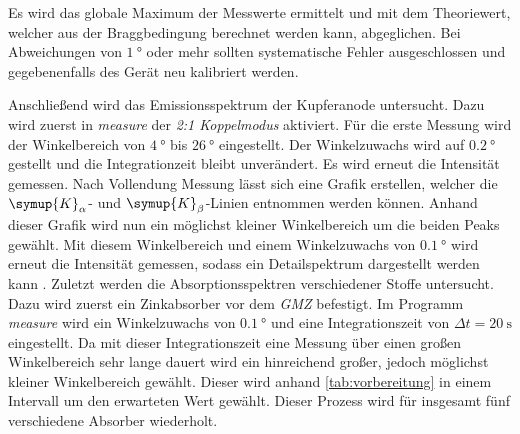 Es wird das globale Maximum der Messwerte ermittelt und mit dem Theoriewert, welcher aus der Braggbedingung berechnet werden kann, abgeglichen.
Bei Abweichungen von $\qty{1}{\degree}$ oder mehr sollten systematische Fehler ausgeschlossen und gegebenenfalls des Gerät neu kalibriert werden.

Anschließend wird das Emissionsspektrum der Kupferanode untersucht. Dazu wird zuerst in \textit{measure} der \textit{2:1 Koppelmodus} aktiviert. Für die erste Messung 
wird der Winkelbereich von $\qty{4}{\degree}$ bis $\qty{26}{\degree}$ eingestellt. Der Winkelzuwachs wird auf $\qty{0.2}{\degree}$ gestellt und die Integrationzeit bleibt 
unverändert. Es wird erneut die Intensität gemessen. Nach Vollendung Messung lässt sich eine Grafik erstellen, welcher die $\symup{K}_\alpha$- und $\symup{K}_\beta$-Linien 
entnommen werden können. Anhand dieser Grafik wird nun ein möglichst kleiner Winkelbereich um die beiden Peaks gewählt. Mit diesem Winkelbereich und einem Winkelzuwachs von
$\qty{0.1}{\degree}$ wird erneut die Intensität gemessen, sodass ein Detailspektrum dargestellt werden kann
. 
Zuletzt werden die Absorptionsspektren verschiedener Stoffe untersucht. Dazu wird zuerst ein Zinkabsorber vor dem \textit{GMZ} befestigt.
Im Programm \textit{measure} wird ein Winkelzuwachs
von $\qty{0.1}{\degree}$ und eine Integrationszeit von $\Delta t = \qty{20}{\second}$ eingestellt. Da mit dieser Integrationszeit eine Messung über einen großen 
Winkelbereich sehr lange dauert wird ein hinreichend großer, jedoch möglichst kleiner Winkelbereich gewählt. Dieser wird anhand \autoref{tab:vorbereitung} in einem Intervall
um den erwarteten Wert gewählt. Dieser Prozess wird für insgesamt fünf verschiedene Absorber wiederholt.
